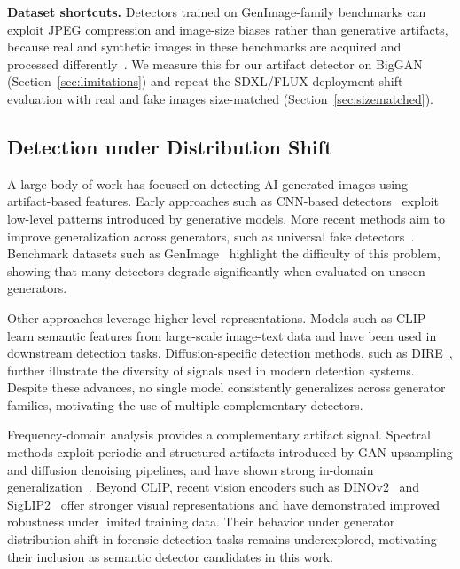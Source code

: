 \documentclass{ieeeaccess}
\begin{document}
\textbf{Dataset shortcuts.} Detectors trained on GenImage-family benchmarks can exploit JPEG compression and image-size biases rather than generative artifacts, because real and synthetic images in these benchmarks are acquired and processed differently~\cite{grommelt2024fake}. We measure this for our artifact detector on BigGAN (Section~\ref{sec:limitations}) and repeat the SDXL/FLUX deployment-shift evaluation with real and fake images size-matched (Section~\ref{sec:sizematched}).

\subsection{Detection under Distribution Shift}

A large body of work has focused on detecting AI-generated images using artifact-based features. Early approaches such as CNN-based detectors~\cite{wang2020cnn} exploit low-level patterns introduced by generative models. More recent methods aim to improve generalization across generators, such as universal fake detectors~\cite{ojha2023fakedetect}. Benchmark datasets such as GenImage~\cite{NEURIPS2023_f4d4a021} highlight the difficulty of this problem, showing that many detectors degrade significantly when evaluated on unseen generators.

Other approaches leverage higher-level representations. Models such as CLIP~\cite{pmlr-v139-radford21a} learn semantic features from large-scale image-text data and have been used in downstream detection tasks. Diffusion-specific detection methods, such as DIRE~\cite{Wang_2023_ICCV}, further illustrate the diversity of signals used in modern detection systems. Despite these advances, no single model consistently generalizes across generator families, motivating the use of multiple complementary detectors.

Frequency-domain analysis provides a complementary artifact signal. Spectral methods
exploit periodic and structured artifacts introduced by GAN upsampling and diffusion
denoising pipelines, and have shown strong in-domain generalization~\cite{Corvi_2023_ICASSP}.
Beyond CLIP, recent vision encoders such as DINOv2~\cite{oquab2023dinov2} and
SigLIP2~\cite{tschannen2025siglip2} offer stronger visual representations and have
demonstrated improved robustness under limited training data. Their behavior under
generator distribution shift in forensic detection tasks remains underexplored, motivating
their inclusion as semantic detector candidates in this work.
\end{document}
